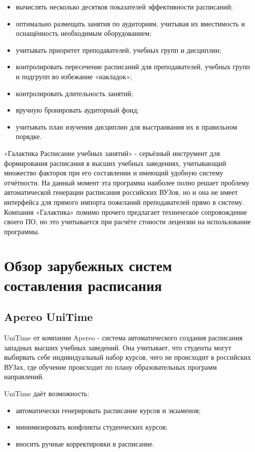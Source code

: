 \begin{itemize}
	\item вычислять несколько десятков показателей эффективности расписаний;
	\item оптимально размещать занятия по аудиториям, учитывая их вместимость и оснащённость необходимым оборудованием;
	\item учитывать приоритет преподавателей, учебных групп и дисциплин;
	\item контролировать пересечение расписаний для преподавателей, учебных групп и подгрупп во избежание «накладок»;
	\item контролировать длительность занятий;
	\item вручную бронировать аудиторный фонд;
	\item учитывать план изучения дисциплин для выстраивания их в правильном порядке.
\end{itemize}

	«Галактика Расписание учебных занятий» - серьёзный инструмент для формирования расписания в высших учебных заведениях, учитывающий множество факторов при его составлении и имеющий удобную систему отчётности. На данный момент эта программа наиболее полно решает проблему автоматической генерации расписания российских ВУЗов, но и она не имеет интерфейса для прямого импорта пожеланий преподавателей прямо в систему. Компания «Галактика» помимо прочего предлагает техническое сопровождение своего ПО, но это учитывается при расчёте стоиости лецензии на использование программы.
	
\section{Обзор зарубежных систем составления расписания} \label{ch1:sec2}	

\subsection {Apereo UniTime}
\cite{https://www.unitime.org/}
UniTime от компании Apereo - система автоматического создания расписания западных высших учебных заведений. Она учитывает, что студенты могут выбирвать себе индивидуальный набор курсов, чего не происходит в российских ВУЗах, где обучение происходит по плану образовательных программ направлений.

UniTime даёт возможность:
\begin{itemize}
	\item автоматически генерировать расписание курсов и экзаменов;
	\item минимизировать конфликты студенческих курсов;
	\item вносить ручные корректировки в расписание.
\end{itemize}

